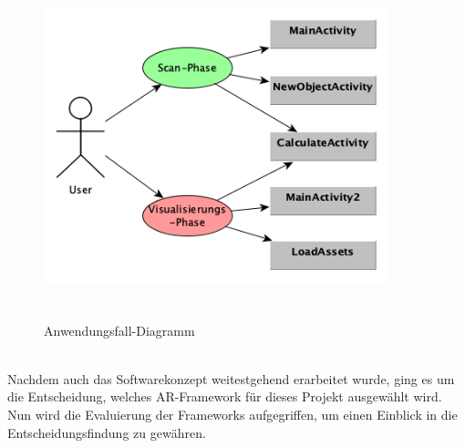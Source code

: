 \begin{figure}[hbt!]
    \centering
    \includegraphics[width=10cm,height=10cm,keepaspectratio]{3Konzeption/Bilder/Anwendungsfalldiagramm.png}
    \caption{Anwendungsfall-Diagramm}
    \label{pic:anwendungsfall}
\end{figure}
\\ 
Nachdem auch das Softwarekonzept weitestgehend erarbeitet wurde, ging es um die Entscheidung, welches \acl{AR}-Framework für dieses Projekt 
ausgewählt wird. Nun wird die Evaluierung der Frameworks aufgegriffen, um einen Einblick in die Entscheidungsfindung zu gewähren.
